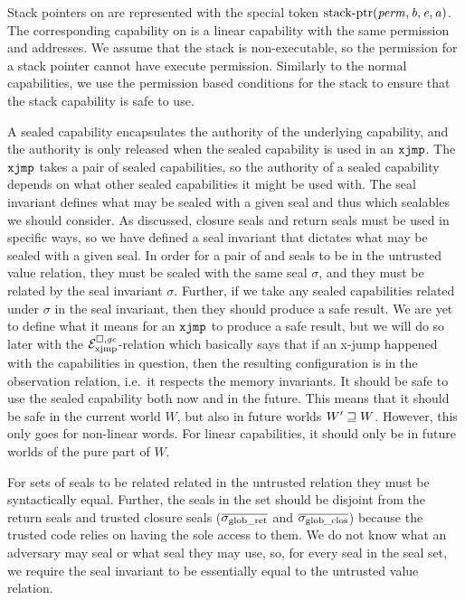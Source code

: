 \begin{jversion}
Stack pointers on \srccm{} are represented with the special token $\mathrm{stack\text{-}ptr}(\mathit{perm},\mathit{b},\mathit{e},\mathit{a})$.
The corresponding capability on \trgcm{} is a linear capability with the same permission and addresses.
We assume that the stack is non-executable, so the permission for a stack pointer cannot have execute permission.
Similarly to the normal capabilities, we use the permission based conditions for the stack to ensure that the stack capability is safe to use.

A sealed capability encapsulates the authority of the underlying capability, and the authority is only released when the sealed capability is used in an $\txjmp{}{}$.
The $\xjmp{}{}$ takes a pair of sealed capabilities, so the authority of a sealed capability depends on what other sealed capabilities it might be used with.
The seal invariant defines what may be sealed with a given seal and thus which sealables we should consider.
As discussed, closure seals and return seals must be used in specific ways, so we have defined a seal invariant that dictates what may be sealed with a given seal.
In order for a pair of \srccm{} and \trgcm{} seals to be in the untrusted value relation, they must be sealed with the same seal $\sigma$, and they must be related by the seal invariant $\sigma$.
Further, if we take any sealed capabilities related under $\sigma$ in the seal invariant, then they should produce a safe result.
We are yet to define what it means for an $\txjmp{}{}$ to produce a safe result, but we will do so later with the $\mathcal{E}^{\square,\mathit{gc}}_{\mathrm{xjmp}}$-relation which basically says that if an x-jump happened with the capabilities in question, then the resulting configuration is in the observation relation, i.e.\ it respects the memory invariants.
It should be safe to use the sealed capability both now and in the future.
This means that it should be safe in the current world $W$, but also in future worlds $W' \sqsupseteq W$.
However, this only goes for non-linear words.
For linear capabilities, it should only be in future worlds of the pure part of $W$.

For sets of seals to be related related in the untrusted relation they must be syntactically equal.
Further, the seals in the set should be disjoint from the return seals and trusted closure seals ($\overline{\sigma_{\mathrm{glob\_ret}}}$ and $\overline{\sigma_{\mathrm{glob\_clos}}}$) because the trusted code relies on having the sole access to them.
We do not know what an adversary may seal or what seal they may use, so, for every seal in the seal set, we require the seal invariant to be essentially equal to the untrusted value relation.


\end{jversion}
